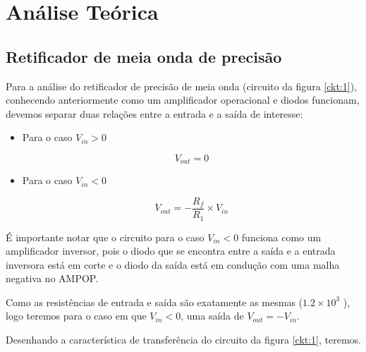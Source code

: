 \setlength{\abovedisplayskip}{-25pt}
\setlength{\belowdisplayskip}{-25pt}

\section{Análise Teórica}

\subsection{Retificador de meia onda de precisão}

Para a análise do retificador de precisão de meia onda (circuito da figura \ref{ckt:1}), conhecendo anteriormente como um amplificador operacional e diodos funcionam, devemos separar duas relações entre a entrada e a saída de interesse:

\begin{itemize}
    \item Para o caso $V_{in}>0$ \\
    \begin{center}
        \begin{equation} \label{vsat+}
            V_{out} = 0
        \end{equation}
    \end{center}
    
    \item Para o caso $V_{in}<0$ \\ 
    
    \begin{center}
        \begin{equation} \label{vsat+}
            V_{out} = -\frac{R_f}{R_1}\times V_{in}
        \end{equation}
    \end{center}
\end{itemize}

É importante notar que o circuito para o caso $V_{in}<0$ funciona como um amplificador inversor, pois o diodo que se encontra entre a saída e a entrada inversora está em corte e o diodo da saída está em condução com uma malha negativa no AMPOP.

Como as resistências de entrada e saída são exatamente as mesmas ($1.2\times10^3$  \ohm), logo teremos para o caso em que $V_{in}<0$, uma saída de $V_{out}=-V_{in}$.

Desenhando a característica de transferência do circuito da figura \ref{ckt:1}, teremos.



